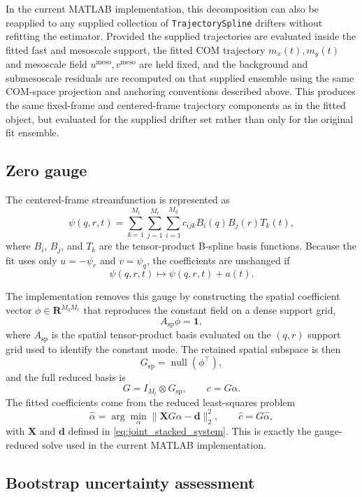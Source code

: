 \documentclass{article}
\begin{document}
In the current MATLAB implementation, this decomposition can also be
reapplied to any supplied collection of \texttt{TrajectorySpline}
drifters without refitting the estimator. Provided the supplied
trajectories are evaluated inside the fitted fast and mesoscale support,
the fitted COM trajectory $m_x(t),m_y(t)$ and mesoscale field
$u^{\mathrm{meso}},v^{\mathrm{meso}}$ are held fixed, and the background
and submesoscale residuals are recomputed on that supplied ensemble
using the same COM-space projection and anchoring conventions described
above. This produces the same fixed-frame and centered-frame trajectory
components as in the fitted object, but evaluated for the supplied
drifter set rather than only for the original fit ensemble.

\subsection{Zero gauge}

 The centered-frame streamfunction is represented as
 \[
 \psi(q,r,t) = \sum_{k=1}^{M_t} \sum_{j=1}^{M_r} \sum_{i=1}^{M_q}
 c_{ijk} B_i(q) B_j(r) T_k(t),
 \]
 where $B_i$, $B_j$, and $T_k$ are the tensor-product B-spline
 basis functions. Because the fit uses only $u = -\psi_r$ and
 $v = \psi_q$, the coefficients are unchanged if
 \[
 \psi(q,r,t) \mapsto \psi(q,r,t) + a(t).
 \]

 The implementation removes this gauge by constructing the spatial
 coefficient vector $\phi \in \mathbf{R}^{M_q M_r}$ that reproduces
 the constant field on a dense support grid,
\[
 A_{\mathrm{sp}} \phi = \mathbf{1},
 \]
 where $A_{\mathrm{sp}}$ is the spatial tensor-product basis evaluated
 on the $(q,r)$ support grid used to identify the constant mode.
 The retained spatial subspace is then
\[
 G_{\mathrm{sp}} = \operatorname{null}(\phi^\top),
 \]
 and the full reduced basis is
\[
 G = I_{M_t} \otimes G_{\mathrm{sp}},
 \qquad
 c = G \alpha.
 \]
 The fitted coefficients come from the reduced least-squares problem
\[
\hat{\alpha} = \arg\min_{\alpha} \|\mathbf{X} G \alpha - \mathbf{d}\|_2^2,
\qquad
\hat{c} = G \hat{\alpha},
\]
with $\mathbf{X}$ and $\mathbf{d}$ defined in
\eqref{eq:joint_stacked_system}. This is exactly the gauge-reduced solve
 used in the current MATLAB implementation.

\subsection{Bootstrap uncertainty assessment}
\end{document}

